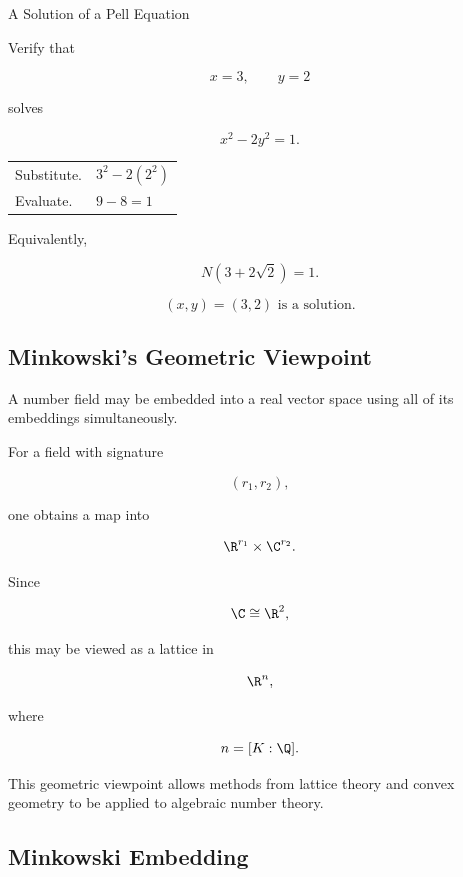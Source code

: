 \begin{workedexamplebox}{A Solution of a Pell Equation}

Verify that

\[ x=3,\qquad y=2 \]

solves

\[ x^2-2y^2=1. \]

\begin{tabularx}{\textwidth}{@{}>{\raggedright\arraybackslash}p{}X@{}}
Substitute. &
\(3^2-2(2^2)\)\\
Evaluate. &
\(9-8=1\)
\end{tabularx}

Equivalently,

\[ N(3+2\sqrt2)=1. \]

\begin{answerbox}
\[ \boxed{(x,y)=(3,2)\text{ is a solution.}} \]
\end{answerbox}
\end{workedexamplebox}

\subsection{Minkowski's Geometric Viewpoint}
\label{subsec:minkowski-viewpoint}

A number field may be embedded into a real vector space using all of its
embeddings simultaneously.

For a field with signature

\[ (r_1,r_2), \]

one obtains a map into

\[ \R^{r_1}\times\C^{r_2}. \]

Since

\[ \C\cong\R^2, \]

this may be viewed as a lattice in

\[ \R^n, \]

where

\[ n=[K:\Q]. \]

This geometric viewpoint allows methods from lattice theory and convex
geometry to be applied to algebraic number theory.

\subsection{Minkowski Embedding}
\label{subsec:minkowski-embedding}


